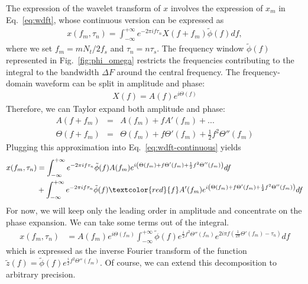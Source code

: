 \documentclass{article}
\begin{document}
The expression of the wavelet transform of $x$ involves the expression of $x_m$ in Eq.~\ref{eq:wdft}, whose continuous version can be expressed as
\begin{align}
\label{eq:wdft-continuous}
    x(f_m, \tau_n) = \int_{-\infty}^{+\infty} e^{-2\pi i f \tau_n} X(f+ f_m)\tilde{\phi}(f) df,
\end{align}
where we set $f_m = m N_t/2 f_s$ and $\tau_n = n \tau_s$.
The frequency window $\tilde{\phi}(f)$ represented in Fig.~\ref{fig:phi_omega} restricts the frequencies contributing to the integral to the bandwidth $\Delta F$ around the central frequency. 
The frequency-domain waveform can be split in amplitude and phase:
\begin{eqnarray}
\label{eq:amplitude_phase_split}
    X(f) = A(f) e^{i\Theta(f)}
\end{eqnarray}
Therefore, we can Taylor expand both amplitude and phase:
\begin{eqnarray}
    A(f + f_m) &=& A(f_m) + f A'(f_m) + ... \\
    \Theta(f + f_m) &=& \Theta(f_m) + f \Theta'(f_m) + \frac{1}{2} f^2 \Theta''(f_m)
\end{eqnarray}
Plugging this approximation into Eq.~\eqref{eq:wdft-continuous} yields
\begin{align}
\label{eq:wdft-continuous-taylor}
    x(f_m, \tau_n) & = \int_{-\infty}^{+\infty} e^{-2\pi i f \tau_n} \tilde{\phi}(f) A(f_m) e^{i \left(\Theta(f_m) + f \Theta'(f_m) + \frac{1}{2} f^2 \Theta''(f_m)\right)} df \nonumber \\
    & + \int_{-\infty}^{+\infty} e^{-2\pi i f \tau_n} \tilde{\phi}(f) \textcolor{red}{f} A'(f_m) e^{i\left(\Theta(f_m) + f \Theta'(f_m) + \frac{1}{2} f^2 \Theta''(f_m)\right)} df
\end{align}
For now, we will keep only the leading order in amplitude and concentrate on the phase expansion. We can take some terms out of the integral.
\begin{align}
\label{eq:wdft-continuous-taylor-2}
    x(f_m, \tau_n) & = A(f_m) e^{i\Theta(f_m)} \int_{-\infty}^{+\infty} \tilde{\phi}(f) e^{\frac{i}{2} f^2 \Theta''(f_m)} e^{2i \pi f \left( \frac{1}{2\pi}\Theta'(f_m) -  \tau_n\right)} df 
\end{align}
which is expressed as the inverse Fourier transform of the function $\tilde{z}(f) = \tilde{\phi}(f) e^{\frac{i}{2} f^2 \Theta''(f_m)}$.
Of course, we can extend this decomposition to arbitrary precision. 
\end{document}
